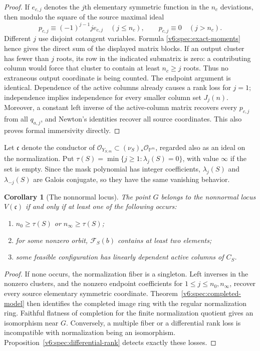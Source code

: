 \documentclass[10pt,fleqn]{article}
\numberwithin{equation}{section}
\newtheorem{corollary}[theorem]{Corollary}
\newcommand{\PP}{\mathbb P}
\begin{document}
\begin{proof}
If $e_{c,j}$ denotes the $j$th elementary symmetric function in the
$n_c$ deviations, then modulo the square of the source maximal ideal
\[
 p_{c,j}\equiv(-1)^{j-1}j e_{c,j}\quad(j\le n_c),
 \qquad p_{c,j}\equiv0\quad(j>n_c).
\]
Different $j$ use disjoint cotangent variables.  Formula
\eqref{v6:spec:exact-moments} hence gives the direct sum of the displayed
matrix blocks.  If an output cluster has fewer than $j$ roots, its row in
the indicated submatrix is zero: a contributing column would force that
cluster to contain at least $n_c\ge j$ roots.  Thus no extraneous output
coordinate is being counted.  The endpoint argument is identical.
Dependence of the active columns already causes a rank loss for $j=1$;
independence implies independence for every smaller column set $J_j(n)$.
Moreover, a constant left inverse of the active-column matrix recovers
every $p_{c,j}$ from all $q_{a,j}$, and Newton's identities recover all
source coordinates.  This also proves formal immersivity directly.
\end{proof}

Let $\mathfrak c$ denote the conductor of
$\mathcal O_{Y_{S,m}}\subset(\nu_S)_*\mathcal O_{\PP^m}$, regarded
also as an ideal on the normalization.  Put
$\tau(S)=\min\{j\ge1:\lambda_j(S)=0\}$, with value $\infty$ if the
set is empty.  Since the mask polynomial has integer coefficients,
$\lambda_j(S)$ and $\lambda_{-j}(S)$ are Galois conjugate, so they have
the same vanishing behavior.

\begin{corollary}[The nonnormal locus]\label{v6:spec:conductor-locus}
The point $G$ belongs to the nonnormal locus $V(\mathfrak c)$ if and only
if at least one of the following occurs:
\begin{enumerate}[label=\textup{(\roman*)}]
\item $n_0\ge\tau(S)$ or $n_\infty\ge\tau(S)$;
\item for some nonzero orbit, $\mathcal F_S(b)$ contains at least two
elements;
\item some feasible configuration has linearly dependent active columns
of $C_S$.
\end{enumerate}
\end{corollary}

\begin{proof}
If none occurs, the normalization fiber is a singleton.  Left inverses
in the nonzero clusters, and the nonzero endpoint coefficients for
$1\le j\le n_0,n_\infty$, recover every source elementary symmetric
coordinate.  Theorem~\ref{v6:spec:completed-model} then identifies the
completed image ring with the regular normalization ring.  Faithful
flatness of completion for the finite normalization quotient gives an
isomorphism near $G$.  Conversely, a multiple fiber or a differential
rank loss is incompatible with normalization being an isomorphism.
Proposition~\ref{v6:spec:differential-rank} detects exactly these losses.
\end{proof}
\end{document}
